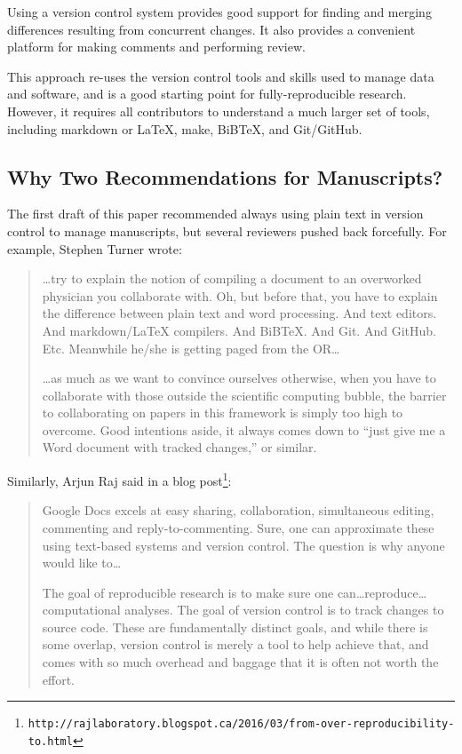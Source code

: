 \documentclass[10pt]{article}
\newcommand{\withurl}[2]{{#1}\footnote{\texttt{#2}}}
\begin{document}
Using a version control system provides good support for finding
and merging differences resulting from concurrent changes. It
also provides a convenient platform for making comments and
performing review.

This approach re-uses the version control tools and skills used to
manage data and software, and is a good starting point for
fully-reproducible research. However, it requires all contributors to
understand a much larger set of tools, including markdown or LaTeX,
make, BiBTeX, and Git/GitHub.

\subsection*{Why Two Recommendations for Manuscripts?}

The first draft of this paper recommended always using plain text in
version control to manage manuscripts, but several reviewers pushed
back forcefully. For example, Stephen Turner wrote:

\begin{quote}
{\ldots}try to explain the notion of compiling a document to an
overworked physician you collaborate with. Oh, but before that, you
have to explain the difference between plain text and word
processing. And text editors. And markdown/LaTeX compilers. And
BiBTeX. And Git. And GitHub. Etc. Meanwhile he/she is getting paged
from the OR{\ldots}

{\ldots}as much as we want to convince ourselves otherwise, when you
have to collaborate with those outside the scientific computing
bubble, the barrier to collaborating on papers in this framework is
simply too high to overcome. Good intentions aside, it always comes
down to ``just give me a Word document with tracked changes,'' or
similar.
\end{quote}

Similarly, Arjun Raj said in \withurl{a blog
  post}{http://rajlaboratory.blogspot.ca/2016/03/from-over-reproducibility-to.html}:

\begin{quote}
Google Docs excels at easy sharing, collaboration, simultaneous
editing, commenting and reply-to-commenting. Sure, one can approximate
these using text-based systems and version control. The question is
why anyone would like to{\ldots}

The goal of reproducible research is to make sure one
can{\dots}reproduce{\ldots}computational analyses. The goal of version
control is to track changes to source code. These are fundamentally
distinct goals, and while there is some overlap, version control is
merely a tool to help achieve that, and comes with so much overhead
and baggage that it is often not worth the effort.
\end{quote}
\end{document}
